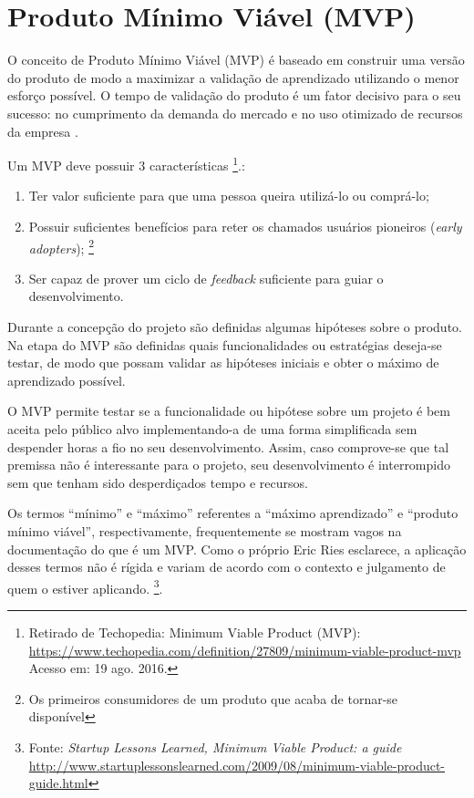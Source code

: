 \section{Produto Mínimo Viável (MVP)}
	\par O conceito de Produto Mínimo Viável (MVP) é baseado em construir uma versão do produto de modo a maximizar a validação de aprendizado utilizando o menor esforço possível. O tempo de validação do produto é um fator decisivo para o seu sucesso: no cumprimento da demanda do mercado e no uso otimizado de recursos da empresa \citep{ries:11}.
    \par Um MVP deve possuir 3 características \footnote{ Retirado de Techopedia: Minimum Viable Product (MVP): \url{https://www.techopedia.com/definition/27809/minimum-viable-product-mvp} Acesso em: 19 ago. 2016.}.:
    \begin{enumerate}
        \item Ter valor suficiente para que uma pessoa queira utilizá-lo ou comprá-lo;
        \item Possuir suficientes benefícios para reter os chamados usuários pioneiros (\emph{early adopters}); \footnote{Os primeiros consumidores de um produto que acaba de tornar-se disponível}
        \item Ser capaz de prover um ciclo de \emph{feedback} suficiente para guiar o desenvolvimento.
\end{enumerate}
    \par Durante a concepção do projeto são definidas algumas hipóteses sobre o produto. Na etapa do MVP são definidas quais funcionalidades ou estratégias deseja-se testar, de modo que possam validar as hipóteses iniciais e obter o máximo de aprendizado possível.
    \par O MVP permite testar se a funcionalidade ou hipótese sobre um projeto é bem aceita pelo público alvo implementando-a de uma forma simplificada sem despender horas a fio no seu desenvolvimento. Assim, caso comprove-se que tal premissa não é interessante para o projeto, seu desenvolvimento é interrompido sem que tenham sido desperdiçados tempo e recursos.
    \par Os termos ``mínimo'' e ``máximo'' referentes a ``máximo aprendizado'' e ``produto mínimo viável'', respectivamente, frequentemente se mostram vagos na documentação do que é um MVP. Como o próprio Eric Ries esclarece, a aplicação desses termos não é rígida e variam de acordo com o contexto e julgamento de quem o estiver aplicando. \footnote{Fonte: \emph{Startup Lessons Learned, Minimum Viable Product: a guide} \url{http://www.startuplessonslearned.com/2009/08/minimum-viable-product-guide.html}}.
